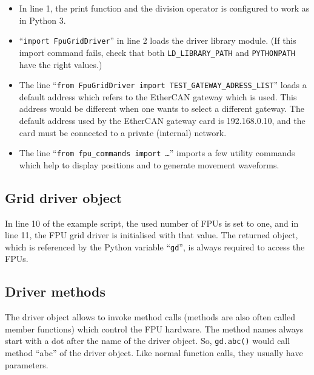 \documentclass[11pt,a4paper]{scrartcl}
\begin{document}
\begin{itemize}
\item In line 1, the print function and the division operator is
  configured to work as in Python 3.
  
\item ``\texttt{import FpuGridDriver}'' in line 2 loads the driver
  library module. (If this import command fails, check that both
  \verb+LD_LIBRARY_PATH+ and \verb+PYTHONPATH+ have the right values.)

\item The line ``\texttt{from FpuGridDriver import
  TEST\_GATEWAY\_ADRESS\_LIST}'' loads a default address which refers to
  the EtherCAN gateway which is used. This address would be different
  when one wants to select a different gateway. The default
  address used by the EtherCAN gateway card is 192.168.0.10,
  and the card must be connected to a private (internal) network.

\item The line ``\texttt{from fpu\_commands import \ldots}'' imports a
  few utility commands which help to display positions and to generate
  movement waveforms.

 
\end{itemize}

\subsection{Grid driver object}

In line 10 of the example script, the used number of FPUs is set to
one, and in line 11, the FPU grid driver is initialised with that
value. The returned object, which is referenced by the Python variable
``\texttt{gd}'', is always required to access the FPUs.

\subsection{Driver methods}
The driver object allows to invoke method calls (methods are also
often called member functions) which control the FPU hardware. The
method names always start with a dot after the name of the driver
object.  So, \texttt{gd.abc()} would call method ``abc'' of the driver
object. Like normal function calls, they usually have parameters.
\end{document}
